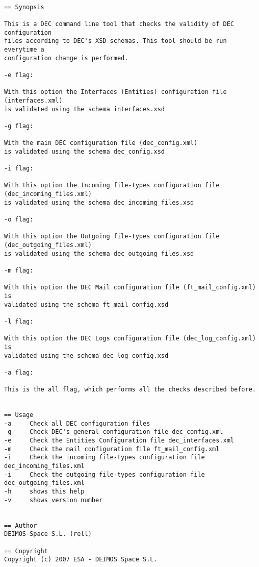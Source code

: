 \documentclass[dec_sum_main.tex]{subfiles}
\begin{document}
\begin{verbatim}

== Synopsis

This is a DEC command line tool that checks the validity of DEC configuration
files according to DEC's XSD schemas. This tool should be run everytime a 
configuration change is performed.

-e flag:

With this option the Interfaces (Entities) configuration file (interfaces.xml)
is validated using the schema interfaces.xsd

-g flag:

With the main DEC configuration file (dec_config.xml)
is validated using the schema dec_config.xsd

-i flag:

With this option the Incoming file-types configuration file (dec_incoming_files.xml)
is validated using the schema dec_incoming_files.xsd

-o flag:

With this option the Outgoing file-types configuration file (dec_outgoing_files.xml)
is validated using the schema dec_outgoing_files.xsd

-m flag:

With this option the DEC Mail configuration file (ft_mail_config.xml) is
validated using the schema ft_mail_config.xsd

-l flag:

With this option the DEC Logs configuration file (dec_log_config.xml) is
validated using the schema dec_log_config.xsd

-a flag:

This is the all flag, which performs all the checks described before.


== Usage
-a     Check all DEC configuration files
-g     Check DEC's general configuration file dec_config.xml
-e     Check the Entities Configuration file dec_interfaces.xml
-m     Check the mail configuration file ft_mail_config.xml
-i     Check the incoming file-types configuration file dec_incoming_files.xml
-i     Check the outgoing file-types configuration file dec_outgoing_files.xml
-h     shows this help
-v     shows version number


== Author
DEIMOS-Space S.L. (rell)

== Copyright
Copyright (c) 2007 ESA - DEIMOS Space S.L.

\end{verbatim}
\end{document}
